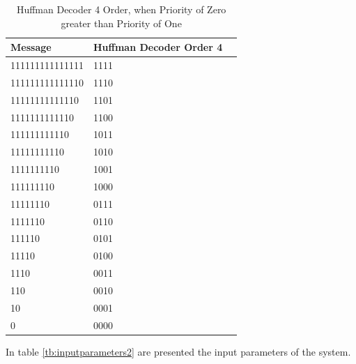 \begin{refsection}
\begin{table}[H]
\centering
\caption{Huffman Decoder 4 Order, when Priority of Zero greater than Priority of One}
\label{tb:hufmmandecoder7}
\begin{tabular}{|l|l|l|}
\hline
\textbf{Message}                      & \textbf{Huffman Decoder Order 4}                                       \\ \hline
111111111111111      & 1111                                                   \\ \hline
111111111111110      & 1110                                        \\ \hline
11111111111110        & 1101                                    \\ \hline
1111111111110          & 1100                             \\ \hline
111111111110            & 1011                                              \\ \hline
11111111110              & 1010                                            \\ \hline
1111111110                & 1001                                         \\ \hline
111111110                  & 1000                                       \\ \hline
11111110                    & 0111                                      \\ \hline
1111110                      & 0110                                     \\ \hline
111110                        & 0101                                 \\ \hline
11110                          & 0100                         \\ \hline
1110                            & 0011                              \\ \hline
110                              & 0010                            \\ \hline
10                                & 0001                         \\ \hline
0                                  & 0000                      \\ \hline
\end{tabular}
\end{table}

In table \ref{tb:inputparameters2} are presented the input parameters of the system.






\end{refsection}
